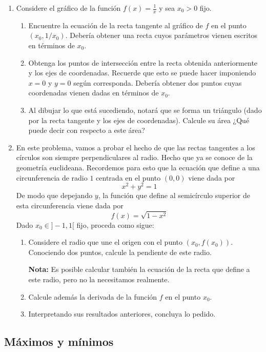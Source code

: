 \begin{enumerate}
    \item Considere el gráfico de la función $f(x) = \frac{1}{x}$ y sea $x_0 > 0$ fijo.
    \begin{enumerate}
        \item Encuentre la ecuación de la recta tangente al gráfico de $f$ en el punto $(x_0, 1/x_0)$. Debería obtener una recta cuyos parámetros vienen escritos en términos de $x_0$.
        \item Obtenga los puntos de intersección entre la recta obtenida anteriormente y los ejes de coordenadas. Recuerde que esto se puede hacer imponiendo $x = 0$ y $y = 0$ según corresponda. Debería obtener dos puntos cuyas coordenadas vienen dadas en términos de $x_0$.
        \item Al dibujar lo que está sucediendo, notará que se forma un triángulo (dado por la recta tangente y los ejes de coordenadas). Calcule su área ¿Qué puede decir con respecto a este área?
    \end{enumerate}
    \item En este problema, vamos a probar el hecho de que las rectas tangentes a los círculos son siempre perpendiculares al radio. Hecho que ya se conoce de la geometría euclideana. Recordemos para esto que la ecuación que define a una circunferencia de radio $1$ centrada en el punto $(0, 0)$ viene dada por
    \[x^2 + y^2 = 1\]
    De modo que depejando $y$, la función que define al semicírculo superior de esta circunferencia viene dada por
    \[f(x) = \sqrt{1 - x^2}\]
    Dado $x_0 \in ]-1, 1[$ fijo, proceda como sigue:
    \begin{enumerate}
        \item Considere el radio que une el origen con el punto $(x_0, f(x_0))$. Conociendo dos puntos, calcule la pendiente de este radio.
        
        \textbf{Nota:} Es posible calcular también la ecuación de la recta que define a este radio, pero no la necesitamos realmente.

        \item Calcule además la derivada de la función $f$ en el punto $x_0$.
        \item Interpretando sus resultados anteriores, concluya lo pedido.
    \end{enumerate}
\end{enumerate}

\subsection{Máximos y mínimos}

